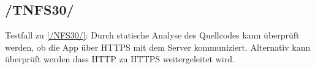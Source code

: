 \subsection*{/TNFS30/}
\label{/TNFS30/} Testfall zu \ref{/NFS30/}: Durch \gls{statische Analyse} des \Gls{Quellcode}s kann überprüft werden, ob die App über \Gls{HTTPS} mit dem \Gls{Server} kommuniziert.
Alternativ kann überprüft werden dass \Gls{HTTP} zu \Gls{HTTPS} weitergeleitet wird.